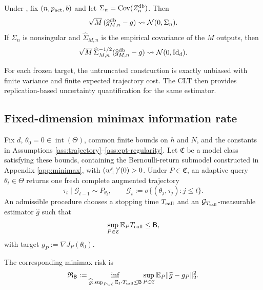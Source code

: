 \begin{theorem}\label{thm:clt}
Under , fix $(n,p_{\rm act},b)$ and let $\Sigma_n=\operatorname{Cov}(Z_n^{\mathrm{db}})$.  Then
\begin{equation}\label{eq:clt}
 \sqrt M\,(\widehat g_{M,n}^{\mathrm{db}}-g)
 \rightsquigarrow \mathcal N(0,\Sigma_n).
\end{equation}
If $\Sigma_n$ is nonsingular and $\widehat\Sigma_{M,n}$ is the empirical covariance of the $M$ outputs, then
\begin{equation}\label{eq:studentized-clt}
 \sqrt M\,\widehat\Sigma_{M,n}^{-1/2}
 (\widehat g_{M,n}^{\mathrm{db}}-g)
 \rightsquigarrow \mathcal N(0,\mathrm{Id}_d).
\end{equation}
\end{theorem}

For each frozen target, the untruncated construction is exactly unbiased with finite variance and finite expected trajectory cost.  The CLT then provides replication-based uncertainty quantification for the same estimator.

\subsection{Fixed-dimension minimax information rate}

\begin{definition}\label{def:minimax-oracle}
Fix $d$, $\theta_0=0\in\operatorname{int}(\Theta)$, common finite bounds on $h$ and $N$, and the constants in Assumptions \ref{ass:trajectory}--\ref{ass:cpt-regularity}.  Let $\mathfrak C$ be a model class satisfying these bounds, containing the Bernoulli-return submodel constructed in Appendix \ref{app:minimax}, with $(w_+^\varepsilon)'(0)>0$.  Under $P\in\mathfrak C$, an adaptive query $\theta_t\in\Theta$ returns one fresh complete augmented trajectory
\[
 \tau_t\mid\mathcal G_{t-1}\sim P_{\theta_t},
 \qquad
 \mathcal G_t:=\sigma\{(\theta_j,\tau_j):j\le t\}.
\]
An admissible procedure chooses a stopping time $T_{\rm call}$ and an $\mathcal G_{T_{\rm call}}$-measurable estimator $\widehat g$ such that
\begin{equation}\label{eq:minimax-budget}
 \sup_{P\in\mathfrak C}\mathbb E_P T_{\rm call}\le\mathsf B,
\end{equation}
with target $g_P:=\nabla J_P(\theta_0)$.
\end{definition}

The corresponding minimax risk is
\begin{equation}\label{eq:minimax-risk}
 \mathfrak R_{\mathsf B}
 :=\inf_{\widehat g:\,\sup_{P\in\mathfrak C}\mathbb E_P T_{\rm call}\le\mathsf B}
 \sup_{P\in\mathfrak C}
 \mathbb E_P\lVert\widehat g-g_P\rVert_2^2.
\end{equation}

